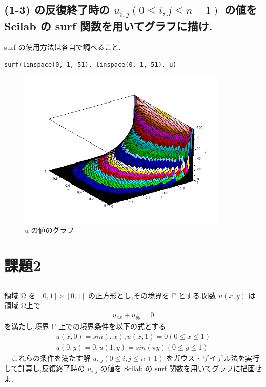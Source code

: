 \documentclass{scrartcl}
\begin{document}
\subsection{(1-3) の反復終了時の \(u_{i,j} (0 \leq i, j \leq n + 1)\) の値を Scilab の surf 関数を用いてグラフに描け.}
\label{sec:org1d6c916}
surf の使用方法は各自で調べること.\\
\begin{verbatim}
surf(linspace(0, 1, 51), linspace(0, 1, 51), u)
\end{verbatim}
\begin{figure}[htbp]
\centering
\includegraphics[width=10cm]{./1-4.png}
\caption{u の値のグラフ}
\end{figure}
\section{課題2}
\label{sec:orgfd450ea}
\subsection{}
\label{sec:orgd65e0d8}
領域 Ω を \([0, 1] \times [0, 1]\) の正方形とし,その境界を Γ とする.関数 \(u(x, y)\) は領域 Ω上で\\
\begin{eqnarray*}
u_{xx} + u_{yy} = 0
\end{eqnarray*}
を満たし,境界 Γ 上での境界条件を以下の式とする.\\
\begin{eqnarray*}
u(x, 0) = sin(\pi x), u(x, 1) = 0 (0 \leq x \leq 1) \\
u(0, y) = 0, u(1, y) = sin(\pi y) (0 \leq y \leq 1)
\end{eqnarray*}
　これらの条件を満たす解 \(u_{i,j} (0 \leq i, j \leq n + 1)\) をガウス・ザイデル法を実行して計算し,反復終了時の \(u_{i,j}\) の値を Scilab の surf 関数を用いてグラフに描画せよ.\\
\end{document}
